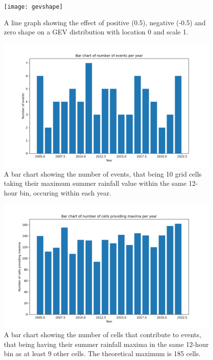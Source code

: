 \documentclass[12pt,a4paper,openany]{report}
\begin{document}
\begin{figure}[H]
    \centering
    \texttt{[image: gevshape]}
    \caption[Line graph for GEV distribution with different shape parameters.]{
       A line graph showing the effect of positive (0.5), negative (-0.5) and zero shape on a GEV
        distribution with location 0 and scale 1.}
    \label{fig:gevshape}
\end{figure}
\begin{figure}[H]
    \centering
    \includegraphics[width=150mm]{eventsyear}
    \caption[A bar chart showing the number of events occurring in each year.]{A bar chart showing the number of events,
        that being 10 grid cells taking their maximum summer rainfall value within the same 12-hour bin,
    occuring within each year.}
    \label{fig:eventsyear}
\end{figure}
\begin{figure}[H]
    \centering
    \includegraphics[width=150mm]{cellsyear}
    \caption[A bar chart showing the number of cells that contribute to events.]{
        A bar chart showing the number of cells that contribute to events,
        that being having their summer rainfall maxima in the same 12-hour bin as at least 9 other cells.
        The theoretical maximum is 185 cells.}
    \label{fig:cellsyear}
\end{figure}




\end{document}

